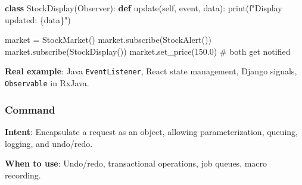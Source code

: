 \documentclass[11pt]{article}
\newenvironment{Shaded}{\begin{snugshade}}{\end{snugshade}}
\newcommand{\BuiltInTok}[1]{\textcolor[rgb]{0.50,0.55,0.55}{#1}}
\newcommand{\CommentTok}[1]{\textcolor[rgb]{0.48,0.49,0.49}{#1}}
\newcommand{\FloatTok}[1]{\textcolor[rgb]{0.96,0.45,0.00}{#1}}
\newcommand{\KeywordTok}[1]{\textcolor[rgb]{0.81,0.81,0.76}{\textbf{#1}}}
\newcommand{\NormalTok}[1]{\textcolor[rgb]{0.81,0.81,0.76}{#1}}
\newcommand{\OperatorTok}[1]{\textcolor[rgb]{0.81,0.81,0.76}{#1}}
\newcommand{\SpecialCharTok}[1]{\textcolor[rgb]{0.24,0.68,0.91}{#1}}
\newcommand{\SpecialStringTok}[1]{\textcolor[rgb]{0.85,0.27,0.33}{#1}}
\newcommand{\VariableTok}[1]{\textcolor[rgb]{0.15,0.68,0.68}{#1}}
\begin{document}
\begin{Shaded}
\begin{Highlighting}[]
\KeywordTok{class}\NormalTok{ StockDisplay(Observer):}
    \KeywordTok{def}\NormalTok{ update(}\VariableTok{self}\NormalTok{, event, data):}
        \BuiltInTok{print}\NormalTok{(}\SpecialStringTok{f"Display updated: }\SpecialCharTok{\{}\NormalTok{data}\SpecialCharTok{\}}\SpecialStringTok{"}\NormalTok{)}

\NormalTok{market }\OperatorTok{=}\NormalTok{ StockMarket()}
\NormalTok{market.subscribe(StockAlert())}
\NormalTok{market.subscribe(StockDisplay())}
\NormalTok{market.set\_price(}\FloatTok{150.0}\NormalTok{)   }\CommentTok{\# both get notified}
\end{Highlighting}
\end{Shaded}

\textbf{Real example}: Java \texttt{EventListener}, React state management, Django signals, \texttt{Observable} in RxJava.

\subsubsection{Command}\label{command}

\textbf{Intent}: Encapsulate a request as an object, allowing parameterization, queuing, logging, and undo/redo.

\textbf{When to use}: Undo/redo, transactional operations, job queues, macro recording.

\end{document}
